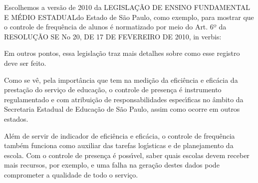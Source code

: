 \documentclass[
12pt,		%
openright,	%
twoside,  %
a4paper,			%
chapter=TITLE,		%
english,			%
french,				%
spanish,			%
brazil				%
]{USPSC-classe/USPSC}
\begin{document}
Escolhemos a vers\~ao de 2010 da \textquotedbl LEGISLA\c{C}\~AO DE ENSINO FUNDAMENTAL E M\'EDIO ESTADUAL\textquotedbl  do Estado de S\~ao Paulo, como exemplo, para mostrar que o controle de frequ\^encia de alunos \'e normatizado por meio do Art. 6º da RESOLU\c{C}\~AO SE No 20, DE 17 DE FEVEREIRO DE 2010, in verbis:


















\noindent\begin{center}\mbox{\centering{}}\end{center}


Em outros pontos, essa legisla\c{c}\~ao traz mais detalhes sobre como esse registro deve ser feito.

















Como se v\^e, pela import\^ancia que tem na medi\c{c}\~ao da efici\^encia e efic\'acia da presta\c{c}\~ao do servi\c{c}o de educa\c{c}\~ao, o controle de presen\c{c}a \'e instrumento regulamentado e com atribui\c{c}\~ao de responsabilidades espec\'{\i}ficas no \^ambito da Secretaria Estadual de Educa\c{c}\~ao de S\~ao Paulo, assim como ocorre em outros estados.

















Al\'em de servir de indicador de efici\^encia e efic\'acia, o controle de frequ\^encia tamb\'em funciona como auxiliar das tarefas log\'{\i}sticas e de planejamento da escola. Com o controle de presen\c{c}a \'e poss\'{\i}vel, saber quais escolas devem receber mais recursos, por exemplo, e uma falha na gera\c{c}\~ao destes dados pode comprometer a qualidade de todo o servi\c{c}o.
\end{document}
